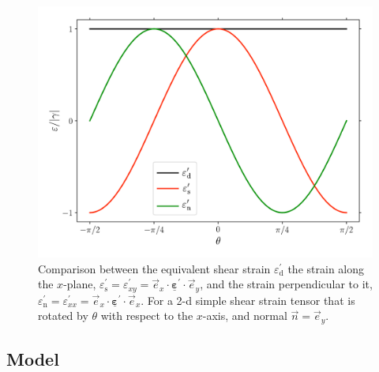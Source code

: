 \documentclass[fleqn]{goose-article}
\newcommand\T[1]{\underline{\bm{{#1}}}}
\begin{document}
\begin{figure}[htp]
    \centering
    \includegraphics[width=.5\textwidth]{figures/strain-modes_2d_epseq}
    \caption{
        Comparison between the equivalent shear strain $\varepsilon_\mathrm{d}^\prime$
        the strain along the $x$-plane,
        $\varepsilon_\mathrm{s}^\prime
        = \varepsilon_{xy}^\prime
        = \vec{e}_x \cdot \T{\varepsilon}^\prime \cdot \vec{e}_y$,
        and the strain perpendicular to it,
        $\varepsilon_\mathrm{n}^\prime
        = \varepsilon_{xx}^\prime
        = \vec{e}_x \cdot \T{\varepsilon}^\prime \cdot \vec{e}_x$.
        For a 2-d simple shear strain tensor that is rotated by $\theta$ with respect
        to the $x$-axis,
        and normal $\vec{n} = \vec{e}_y$.}
    \label{fig:shear-modes:epseq}
\end{figure}

\subsection{Model}
\end{document}
